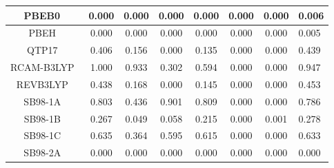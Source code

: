\begin{tabular}{|c|c|c|c|c|c|c|l|}
                                 PBEB0~\cite{delCampo2012_104108} &                0.000 &                          0.000 &             0.000 &                        0.000 &                0.000 &                0.000 &                       0.006 \\ \hline
                    PBEH~\cite{Adamo1999_6158,Ernzerhof1999_5029} &                0.000 &                          0.000 &             0.000 &                        0.000 &                0.000 &                0.000 &                       0.005 \\ \hline
                                      QTP17~\cite{Jin2018_064111} &                0.406 &                          0.156 &             0.000 &                        0.135 &                0.000 &                0.000 &                       0.439 \\ \hline
                               RCAM-B3LYP~\cite{Cohen2007_191109} &                1.000 &                          0.933 &             0.302 &                        0.594 &                0.000 &                0.000 &                       0.947 \\ \hline
                                        REVB3LYP~\cite{Lu2013_64} &                0.438 &                          0.168 &             0.000 &                        0.145 &                0.000 &                0.000 &                       0.453 \\ \hline
                                 SB98-1A~\cite{Schmider1998_9624} &                0.803 &                          0.436 &             0.901 &                        0.809 &                0.000 &                0.000 &                       0.786 \\ \hline
                                 SB98-1B~\cite{Schmider1998_9624} &                0.267 &                          0.049 &             0.058 &                        0.215 &                0.000 &                0.001 &                       0.278 \\ \hline
                                 SB98-1C~\cite{Schmider1998_9624} &                0.635 &                          0.364 &             0.595 &                        0.615 &                0.000 &                0.000 &                       0.633 \\ \hline
                                 SB98-2A~\cite{Schmider1998_9624} &                0.000 &                          0.000 &             0.000 &                        0.000 &                0.000 &                0.000 &                       0.000 \\ \hline

\end{tabular}
